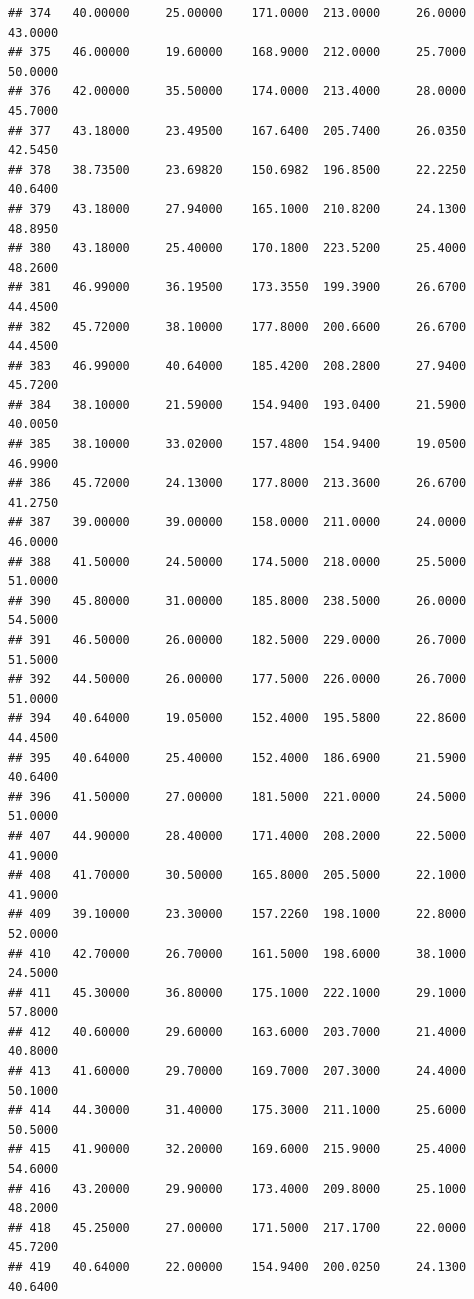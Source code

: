 \documentclass[]{article}
\begin{document}
\begin{verbatim}
## 374   40.00000     25.00000    171.0000  213.0000     26.0000       43.0000
## 375   46.00000     19.60000    168.9000  212.0000     25.7000       50.0000
## 376   42.00000     35.50000    174.0000  213.4000     28.0000       45.7000
## 377   43.18000     23.49500    167.6400  205.7400     26.0350       42.5450
## 378   38.73500     23.69820    150.6982  196.8500     22.2250       40.6400
## 379   43.18000     27.94000    165.1000  210.8200     24.1300       48.8950
## 380   43.18000     25.40000    170.1800  223.5200     25.4000       48.2600
## 381   46.99000     36.19500    173.3550  199.3900     26.6700       44.4500
## 382   45.72000     38.10000    177.8000  200.6600     26.6700       44.4500
## 383   46.99000     40.64000    185.4200  208.2800     27.9400       45.7200
## 384   38.10000     21.59000    154.9400  193.0400     21.5900       40.0050
## 385   38.10000     33.02000    157.4800  154.9400     19.0500       46.9900
## 386   45.72000     24.13000    177.8000  213.3600     26.6700       41.2750
## 387   39.00000     39.00000    158.0000  211.0000     24.0000       46.0000
## 388   41.50000     24.50000    174.5000  218.0000     25.5000       51.0000
## 390   45.80000     31.00000    185.8000  238.5000     26.0000       54.5000
## 391   46.50000     26.00000    182.5000  229.0000     26.7000       51.5000
## 392   44.50000     26.00000    177.5000  226.0000     26.7000       51.0000
## 394   40.64000     19.05000    152.4000  195.5800     22.8600       44.4500
## 395   40.64000     25.40000    152.4000  186.6900     21.5900       40.6400
## 396   41.50000     27.00000    181.5000  221.0000     24.5000       51.0000
## 407   44.90000     28.40000    171.4000  208.2000     22.5000       41.9000
## 408   41.70000     30.50000    165.8000  205.5000     22.1000       41.9000
## 409   39.10000     23.30000    157.2260  198.1000     22.8000       52.0000
## 410   42.70000     26.70000    161.5000  198.6000     38.1000       24.5000
## 411   45.30000     36.80000    175.1000  222.1000     29.1000       57.8000
## 412   40.60000     29.60000    163.6000  203.7000     21.4000       40.8000
## 413   41.60000     29.70000    169.7000  207.3000     24.4000       50.1000
## 414   44.30000     31.40000    175.3000  211.1000     25.6000       50.5000
## 415   41.90000     32.20000    169.6000  215.9000     25.4000       54.6000
## 416   43.20000     29.90000    173.4000  209.8000     25.1000       48.2000
## 418   45.25000     27.00000    171.5000  217.1700     22.0000       45.7200
## 419   40.64000     22.00000    154.9400  200.0250     24.1300       40.6400

\end{verbatim}
\end{document}
